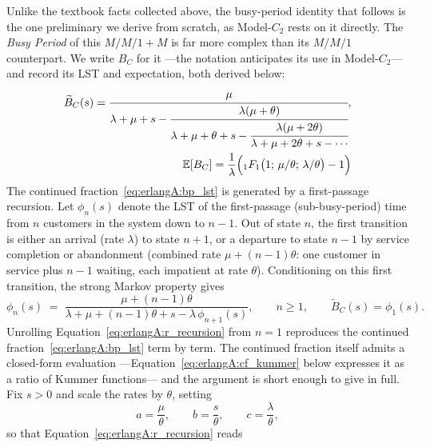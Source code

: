 Unlike the textbook facts collected above, the busy-period identity that follows is the one preliminary we derive from scratch, as Model-$C_2$ rests on it directly. The \emph{Busy Period} of this $M/M/1+M$ is far more complex than its $M/M/1$ counterpart. We write $B_C$ for it ---the notation anticipates its use in Model-$C_2$--- and record its LST and expectation, both derived below:
\begin{align}
    \begin{split}
    \widetilde{B}_C(s) = \cfrac{\mu}{\lambda+\mu+s
      -\cfrac{\lambda(\mu+\theta)}{\lambda+\mu+\theta+s
      -\cfrac{\lambda(\mu+2\theta)}{\lambda+\mu+2\theta+s-\dotsb}}},
    \label{eq:erlangA:bp_lst}
    \end{split} \\
    \begin{split}
        \mathbb{E}[B_C] = \frac{1}{\lambda}\Bigl({}_1F_1\bigl(1;\,\mu/\theta;\,\lambda/\theta\bigr) - 1\Bigr)
        \label{eq:erlangA:bp_mean}
    \end{split}
\end{align}
The continued fraction~\eqref{eq:erlangA:bp_lst} is generated by a first-passage recursion.
Let $\phi_n(s)$ denote the LST of the first-passage (sub-busy-period) time from $n$
customers in the system down to $n-1$. Out of state $n$, the first transition is either an
arrival (rate $\lambda$) to state $n+1$, or a departure to state $n-1$ by service completion
or abandonment (combined rate $\mu+(n-1)\theta$: one customer in service plus $n-1$ waiting,
each impatient at rate $\theta$). Conditioning on this first transition, the strong Markov
property gives
\begin{equation}
    \phi_n(s) \;=\; \frac{\mu+(n-1)\theta}
        {\lambda+\mu+(n-1)\theta+s-\lambda\,\phi_{n+1}(s)},
    \qquad n\ge 1, \qquad \widetilde{B}_C(s)=\phi_1(s).
    \label{eq:erlangA:r_recursion}
\end{equation}
Unrolling Equation~\eqref{eq:erlangA:r_recursion} from $n=1$ reproduces the continued
fraction~\eqref{eq:erlangA:bp_lst} term by term. The continued fraction itself admits a
closed-form evaluation ---Equation~\eqref{eq:erlangA:cf_kummer} below expresses it as a
ratio of Kummer functions--- and the argument is short enough to give in full. Fix $s>0$
and scale the rates by $\theta$, setting
\begin{equation*}
    a=\frac{\mu}{\theta}, \qquad b=\frac{s}{\theta}, \qquad c=\frac{\lambda}{\theta},
\end{equation*}
so that Equation~\eqref{eq:erlangA:r_recursion} reads
